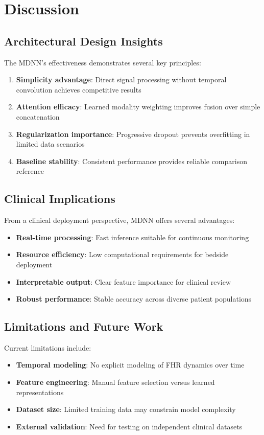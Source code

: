 \documentclass[12pt,a4paper]{article}
\begin{document}
\section{Discussion}

\subsection{Architectural Design Insights}
The MDNN's effectiveness demonstrates several key principles:

\begin{enumerate}
    \item \textbf{Simplicity advantage}: Direct signal processing without temporal convolution achieves competitive results
    \item \textbf{Attention efficacy}: Learned modality weighting improves fusion over simple concatenation
    \item \textbf{Regularization importance}: Progressive dropout prevents overfitting in limited data scenarios
    \item \textbf{Baseline stability}: Consistent performance provides reliable comparison reference
\end{enumerate}

\subsection{Clinical Implications}
From a clinical deployment perspective, MDNN offers several advantages:

\begin{itemize}
    \item \textbf{Real-time processing}: Fast inference suitable for continuous monitoring
    \item \textbf{Resource efficiency}: Low computational requirements for bedside deployment
    \item \textbf{Interpretable output}: Clear feature importance for clinical review
    \item \textbf{Robust performance}: Stable accuracy across diverse patient populations
\end{itemize}

\subsection{Limitations and Future Work}
Current limitations include:

\begin{itemize}
    \item \textbf{Temporal modeling}: No explicit modeling of FHR dynamics over time
    \item \textbf{Feature engineering}: Manual feature selection versus learned representations
    \item \textbf{Dataset size}: Limited training data may constrain model complexity
    \item \textbf{External validation}: Need for testing on independent clinical datasets
\end{itemize}
\end{document}
